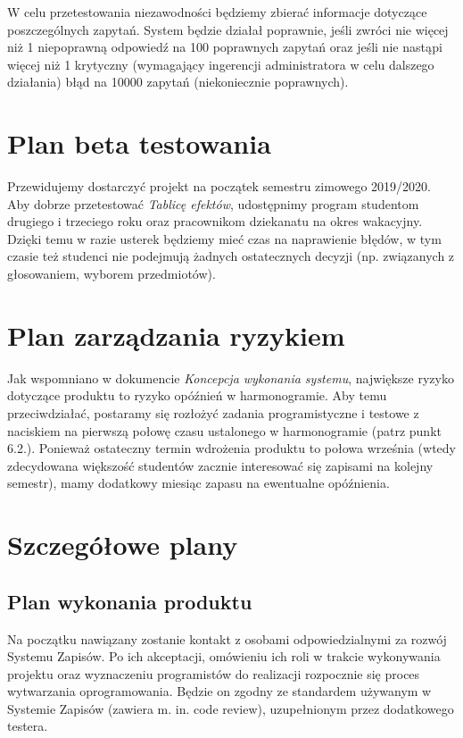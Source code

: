 \documentclass{article}
\begin{document}
W celu przetestowania niezawodności będziemy zbierać informacje dotyczące poszczególnych zapytań.
System będzie działał poprawnie, jeśli zwróci nie więcej niż 1 niepoprawną odpowiedź na 100 poprawnych zapytań oraz jeśli nie nastąpi więcej niż 1 krytyczny (wymagający ingerencji administratora w celu dalszego działania) błąd na 10000 zapytań (niekoniecznie poprawnych).

\section{Plan beta testowania}
Przewidujemy dostarczyć projekt na początek semestru zimowego 2019/2020.
Aby dobrze przetestować \textit{Tablicę efektów}, udostępnimy program studentom drugiego i trzeciego roku oraz pracownikom dziekanatu na okres wakacyjny.
Dzięki temu w razie usterek będziemy mieć czas na naprawienie błędów, w tym czasie też studenci nie podejmują żadnych ostatecznych decyzji (np. związanych z głosowaniem, wyborem przedmiotów).

\section{Plan zarządzania ryzykiem}
Jak wspomniano w dokumencie \textit{Koncepcja wykonania systemu}, największe ryzyko dotyczące produktu to ryzyko opóźnień w harmonogramie.
Aby temu przeciwdziałać, postaramy się rozłożyć zadania programistyczne i testowe z naciskiem na pierwszą połowę czasu ustalonego w harmonogramie (patrz punkt 6.2.).
Ponieważ ostateczny termin wdrożenia produktu to połowa września (wtedy zdecydowana większość studentów zacznie interesować się zapisami na kolejny semestr), mamy dodatkowy miesiąc zapasu na ewentualne opóźnienia.

\section{Szczegółowe plany}
\subsection{Plan wykonania produktu}
Na początku nawiązany zostanie kontakt z osobami odpowiedzialnymi za rozwój Systemu Zapisów.
Po ich akceptacji, omówieniu ich roli w trakcie wykonywania projektu oraz wyznaczeniu programistów do realizacji rozpocznie się proces wytwarzania oprogramowania.
Będzie on zgodny ze standardem używanym w Systemie Zapisów (zawiera m. in. code review), uzupełnionym przez dodatkowego testera.
\end{document}
